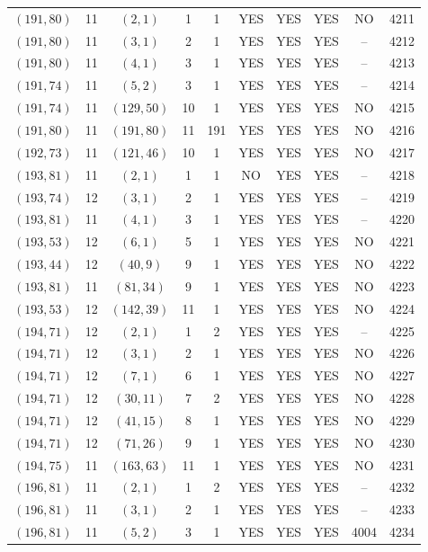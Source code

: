 \begin{longtable}{|c|c|c|c|c|c|c|c|c|c|}
$(191, 80)$ & 11 & $(2, 1)$ & 1 & 1 & YES & YES & YES & NO & 4211\\
$(191, 80)$ & 11 & $(3, 1)$ & 2 & 1 & YES & YES & YES & -- & 4212\\
$(191, 80)$ & 11 & $(4, 1)$ & 3 & 1 & YES & YES & YES & -- & 4213\\
$(191, 74)$ & 11 & $(5, 2)$ & 3 & 1 & YES & YES & YES & -- & 4214\\
$(191, 74)$ & 11 & $(129, 50)$ & 10 & 1 & YES & YES & YES & NO & 4215\\
$(191, 80)$ & 11 & $(191, 80)$ & 11 & 191 & YES & YES & YES & NO & 4216\\
$(192, 73)$ & 11 & $(121, 46)$ & 10 & 1 & YES & YES & YES & NO & 4217\\
$(193, 81)$ & 11 & $(2, 1)$ & 1 & 1 & NO & YES & YES & -- & 4218\\
$(193, 74)$ & 12 & $(3, 1)$ & 2 & 1 & YES & YES & YES & -- & 4219\\
$(193, 81)$ & 11 & $(4, 1)$ & 3 & 1 & YES & YES & YES & -- & 4220\\
$(193, 53)$ & 12 & $(6, 1)$ & 5 & 1 & YES & YES & YES & NO & 4221\\
$(193, 44)$ & 12 & $(40, 9)$ & 9 & 1 & YES & YES & YES & NO & 4222\\
$(193, 81)$ & 11 & $(81, 34)$ & 9 & 1 & YES & YES & YES & NO & 4223\\
$(193, 53)$ & 12 & $(142, 39)$ & 11 & 1 & YES & YES & YES & NO & 4224\\
$(194, 71)$ & 12 & $(2, 1)$ & 1 & 2 & YES & YES & YES & -- & 4225\\
$(194, 71)$ & 12 & $(3, 1)$ & 2 & 1 & YES & YES & YES & NO & 4226\\
$(194, 71)$ & 12 & $(7, 1)$ & 6 & 1 & YES & YES & YES & NO & 4227\\
$(194, 71)$ & 12 & $(30, 11)$ & 7 & 2 & YES & YES & YES & NO & 4228\\
$(194, 71)$ & 12 & $(41, 15)$ & 8 & 1 & YES & YES & YES & NO & 4229\\
$(194, 71)$ & 12 & $(71, 26)$ & 9 & 1 & YES & YES & YES & NO & 4230\\
$(194, 75)$ & 11 & $(163, 63)$ & 11 & 1 & YES & YES & YES & NO & 4231\\
$(196, 81)$ & 11 & $(2, 1)$ & 1 & 2 & YES & YES & YES & -- & 4232\\
$(196, 81)$ & 11 & $(3, 1)$ & 2 & 1 & YES & YES & YES & -- & 4233\\
$(196, 81)$ & 11 & $(5, 2)$ & 3 & 1 & YES & YES & YES & 4004 & 4234\\

\end{longtable}
